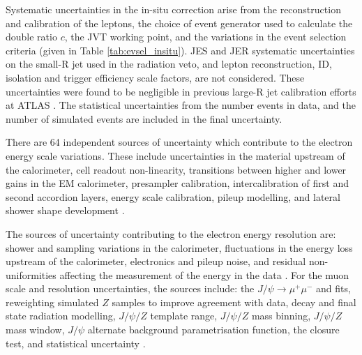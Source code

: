 Systematic uncertainties in the in-situ correction arise from the reconstruction and calibration of the leptons, the choice of event generator used to calculate the double ratio $c$, the JVT working point, and the variations in the event selection criteria (given in Table \ref{tab:evsel_insitu}). JES and JER systematic uncertainties on the small-R jet used in the radiation veto, and lepton reconstruction, ID, isolation and trigger efficiency scale factors, are not considered. These uncertainties were found to be negligible in previous large-R jet calibration efforts at ATLAS \cite{Atlas:largercali}. The statistical uncertainties from the number events in data, and the number of simulated events are included in the final uncertainty. 

There are 64 independent sources of uncertainty which contribute to the electron energy scale variations. These include uncertainties in the material upstream of the calorimeter, cell readout non-linearity, transitions between higher and lower gains in the EM calorimeter, presampler calibration, intercalibration of first and second accordion layers, \zee energy scale calibration, pileup modelling, and lateral shower shape development \cite{Atlas:egamcal_fullrun2}. 

The sources of uncertainty contributing to the electron energy resolution are: shower and sampling variations in the calorimeter, fluctuations in the energy loss upstream of the calorimeter, electronics and pileup noise, and residual non-uniformities affecting the measurement of the energy in the data \cite{Atlas:egamcal_run2}. For the muon \pt scale and resolution uncertainties, the sources include: the $J/\psi\rightarrow\mu^+\mu^-$ and \zmm fits, reweighting simulated $Z$ samples to improve agreement with data, decay and final state radiation modelling, $J/\psi/Z$ \pt template range, $J/\psi/Z$ mass binning, $J/\psi/Z$ mass window, $J/\psi$ alternate background parametrisation function, the closure test, and statistical uncertainty \cite{Insitu:muoncal}.


